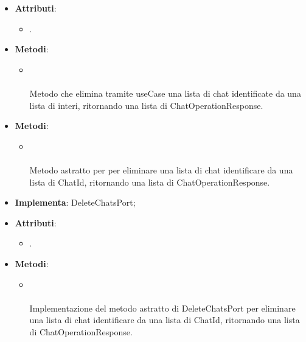 \documentclass[10pt, a4paper]{article}
\begin{document}
\label{DeleteChatsControllerDettaglio}
\begin{itemize}
    \item \textbf{Attributi}:
    \begin{itemize}
        \item {}.
    \end{itemize}
    \item \textbf{Metodi}:
    \begin{itemize}
        \item {}\\ \\
        Metodo che elimina tramite useCase una lista di chat identificate da una lista di interi, ritornando una lista di ChatOperationResponse.
    \end{itemize}
\end{itemize}


\label{DeleteChatsPortDettaglio}
\begin{itemize}
    \item \textbf{Metodi}:
    \begin{itemize}
        \item {}\\ \\
        Metodo astratto per per eliminare una lista di chat identificare da una lista di ChatId, ritornando una lista di ChatOperationResponse.
    \end{itemize}
\end{itemize}


\label{DeleteChatsPostgresDettaglio}
\begin{itemize}
    \item \textbf{Implementa}: DeleteChatsPort;
    \item \textbf{Attributi}:
    \begin{itemize}
        \item {}.
    \end{itemize}
    \item \textbf{Metodi}:
    \begin{itemize}
        \item {}\\ \\
        Implementazione del metodo astratto di DeleteChatsPort per eliminare una lista di chat identificare da una lista di ChatId, ritornando una lista di ChatOperationResponse.
    \end{itemize}
\end{itemize}
\end{document}
